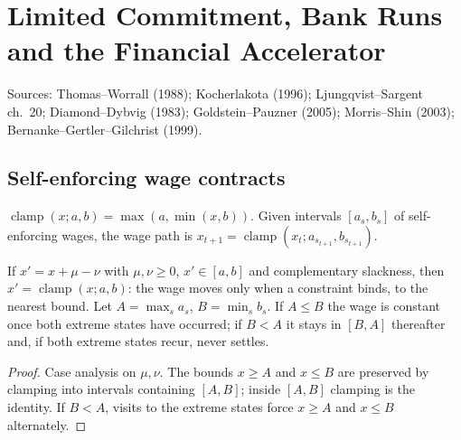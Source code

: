 \chapter{Limited Commitment, Bank Runs and the Financial Accelerator}
\label{chap:contracts_runs}

Sources: Thomas--Worrall (1988); Kocherlakota (1996); Ljungqvist--Sargent ch.~20; Diamond--Dybvig (1983);
Goldstein--Pauzner (2005); Morris--Shin (2003); Bernanke--Gertler--Gilchrist (1999).

\section{Self-enforcing wage contracts}

\begin{definition}
\label{def:tw}
\leanok
$\operatorname{clamp}(x;a,b)=\max(a,\min(x,b))$. Given intervals $[a_s,b_s]$ of self-enforcing wages, the wage path is
$x_{t+1}=\operatorname{clamp}(x_t;a_{s_{t+1}},b_{s_{t+1}})$.
\end{definition}

\begin{theorem}
\label{thm:tw}
\leanok
{}
If $x'=x+\mu-\nu$ with $\mu,\nu\ge0$, $x'\in[a,b]$ and complementary slackness, then $x'=\operatorname{clamp}(x;a,b)$: the wage
moves only when a constraint binds, to the nearest bound. Let $A=\max_sa_s$, $B=\min_sb_s$. If $A\le B$ the wage is constant once
both extreme states have occurred; if $B<A$ it stays in $[B,A]$ thereafter and, if both extreme states recur, never settles.
\end{theorem}
\begin{proof}
\leanok
Case analysis on $\mu,\nu$. The bounds $x\ge A$ and $x\le B$ are preserved by clamping into intervals containing $[A,B]$; inside
$[A,B]$ clamping is the identity. If $B<A$, visits to the extreme states force $x\ge A$ and $x\le B$ alternately.
\end{proof}

